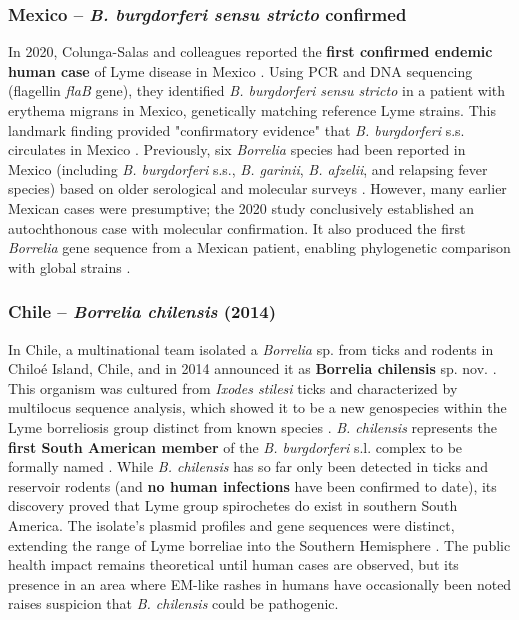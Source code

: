\documentclass[11pt,letterpaper]{article}
\begin{document}
\subsubsection{Mexico – \textit{B. burgdorferi sensu stricto} confirmed}
In 2020, Colunga-Salas and colleagues reported the \textbf{first confirmed endemic human case} of Lyme disease in Mexico \citep{Colunga-Salas2020b}. Using PCR and DNA sequencing (flagellin \textit{flaB} gene), they identified \textit{B. burgdorferi sensu stricto} in a patient with erythema migrans in Mexico, genetically matching reference Lyme strains. This landmark finding provided "confirmatory evidence" that \textit{B. burgdorferi} s.s. circulates in Mexico \citep{Colunga-Salas2020c}. Previously, six \textit{Borrelia} species had been reported in Mexico (including \textit{B. burgdorferi} s.s., \textit{B. garinii}, \textit{B. afzelii}, and relapsing fever species) based on older serological and molecular surveys \citep{Colunga-Salas2020d}. However, many earlier Mexican cases were presumptive; the 2020 study conclusively established an autochthonous case with molecular confirmation. It also produced the first \textit{Borrelia} gene sequence from a Mexican patient, enabling phylogenetic comparison with global strains \citep{Colunga-Salas2020e}.

\subsubsection{Chile – \textit{Borrelia chilensis} (2014)}
In Chile, a multinational team isolated a \textit{Borrelia} sp. from ticks and rodents in Chiloé Island, Chile, and in 2014 announced it as \textbf{Borrelia chilensis} sp. nov. \citep{Ivanova2014}. This organism was cultured from \textit{Ixodes stilesi} ticks and characterized by multilocus sequence analysis, which showed it to be a new genospecies within the Lyme borreliosis group distinct from known species \citep{Ivanova2014a}. \textit{B. chilensis} represents the \textbf{first South American member} of the \textit{B. burgdorferi} s.l. complex to be formally named \citep{Ivanova2014b}. While \textit{B. chilensis} has so far only been detected in ticks and reservoir rodents (and \textbf{no human infections} have been confirmed to date), its discovery proved that Lyme group spirochetes do exist in southern South America. The isolate's plasmid profiles and gene sequences were distinct, extending the range of Lyme borreliae into the Southern Hemisphere \citep{Ivanova2014c}. The public health impact remains theoretical until human cases are observed, but its presence in an area where EM-like rashes in humans have occasionally been noted raises suspicion that \textit{B. chilensis} could be pathogenic.
\end{document}
